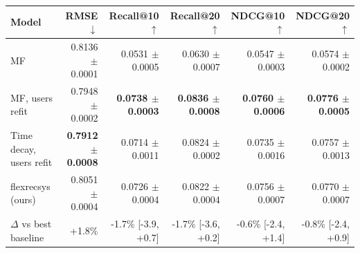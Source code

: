 \begin{tabular}{lrrrrr}
\toprule
Model & RMSE $\downarrow$ & Recall@10 $\uparrow$ & Recall@20 $\uparrow$ & NDCG@10 $\uparrow$ & NDCG@20 $\uparrow$ \\
\midrule
MF & 0.8136 $\pm$ 0.0001 & 0.0531 $\pm$ 0.0005 & 0.0630 $\pm$ 0.0007 & 0.0547 $\pm$ 0.0003 & 0.0574 $\pm$ 0.0002 \\
MF, users refit & 0.7948 $\pm$ 0.0002 & \textbf{0.0738 $\pm$ 0.0003} & \textbf{0.0836 $\pm$ 0.0008} & \textbf{0.0760 $\pm$ 0.0006} & \textbf{0.0776 $\pm$ 0.0005} \\
Time decay, users refit & \textbf{0.7912 $\pm$ 0.0008} & 0.0714 $\pm$ 0.0011 & 0.0824 $\pm$ 0.0002 & 0.0735 $\pm$ 0.0016 & 0.0757 $\pm$ 0.0013 \\
flexrecsys (ours) & 0.8051 $\pm$ 0.0004 & 0.0726 $\pm$ 0.0004 & 0.0822 $\pm$ 0.0004 & 0.0756 $\pm$ 0.0007 & 0.0770 $\pm$ 0.0007 \\
\midrule
$\Delta$ vs best baseline & +1.8\% & -1.7\% [-3.9, +0.7] & -1.7\% [-3.6, +0.2] & -0.6\% [-2.4, +1.4] & -0.8\% [-2.4, +0.9] \\
\bottomrule
\end{tabular}
